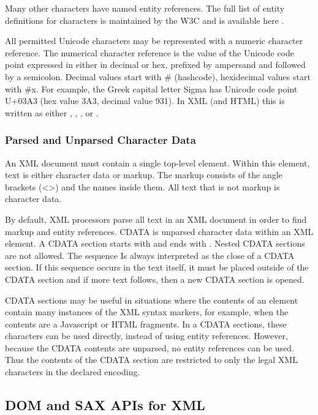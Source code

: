 Many other characters have named entity references.  The full list of 
entity definitions for characters is maintained by the W3C and is available here
.

All permitted Unicode characters may be represented with a numeric character reference.
The numerical character reference is the value of the Unicode code point
expressed in either in decimal or hex, 
prefixed by ampersand and followed by a semicolon.
Decimal values start with \# (hashcode), hexidecimal values start with \#x.
For example, the Greek capital letter Sigma has Unicode code point U+03A3
(hex value 3A3, decimal value 931).  In XML (and HTML) this is written as either
, , ,  or .

\subsubsection{Parsed and Unparsed Character Data}\label{xml-pcdata-cdata}

An XML document must contain a single top-level element.
Within this element, text is either character data or markup.
The markup consists of the angle brackets (<>) and the names inside them.
All text that is not markup is character data.

By default, XML processors parse all text in an XML document
in order to find markup and entity references.
CDATA is unparsed character data within an XML element.
A CDATA section starts with \code{<!CDATA[} and ends with \code{]]>}.
Nested CDATA sections are not allowed.  The sequence \code{]]>}
Is always interpreted as the close of a CDATA section.
If this sequence occurs in the text itself, it must be placed outside
of the CDATA section and if more text follows, then a new CDATA section is opened.

CDATA sections may be useful in situations where the contents of
an element contain many instances of the XML syntax markers, for example, when the
contents are a Javascript or HTML fragments.  In a CDATA sections, these characters can
be used directly, instead of using entity references.  However, because the CDATA
contents are unparsed, no entity references can be used.  Thus the contents of the
CDATA section are restricted to only the legal XML characters in the declared encoding.


\subsection{DOM and SAX APIs for XML}\label{xml-dom-sax}

